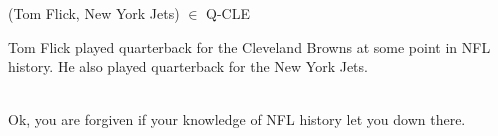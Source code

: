 \documentclass{ximera}
\begin{document}
\begin{problem}  (Tom Flick, New York Jets) $\in$ Q-CLE
\begin{feedback}
Tom Flick played quarterback for the Cleveland Browns at some point in NFL history. He also played quarterback for the New York Jets.\end{feedback}
\end{problem}

\quad \\

Ok, you are forgiven if your knowledge of NFL history let you down there.
\end{document}
